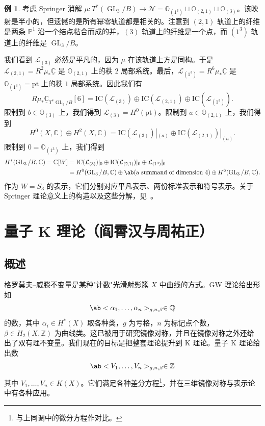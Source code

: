\documentclass{amsart}
\theoremstyle{definition}
\newtheorem{exm}[thm]{例}
\theoremstyle{remark}
\theoremstyle{plain}
\theoremstyle{definition}
\theoremstyle{remark}
\newcommand{\C}{\mathbb{C}}
\newcommand{\Z}{\mathbb{Z}}
\newcommand{\Q}{\mathbb{Q}}
\renewcommand{\P}{\mathbb{P}}
\newcommand{\mc}[1]{\mathcal{#1}}
\newcommand{\mr}[1]{\mathrm{#1}}
\newcommand{\on}[1]{\operatorname{#1}}
\newcommand{\ul}[1]{\underline{#1}}
\newcommand{\1}{\mathbf{1}}
\newcommand{\2}{\mathbf{2}}
\newcommand{\3}{\mathbf{3}}
\begin{document}
\begin{exm}
    考虑 Springer 消解 \(\mu \colon T^*(\on{GL}_3/B) \to \mc{N} = \mathbb{O}_{(1^3)} \sqcup \mathbb{O}_{(2,1)} \sqcup \mathbb{O}_{(3)}\)。该映射是半小的，但遗憾的是所有幂零轨道都是相关的。注意到 \((2,1)\) 轨道上的纤维是两条 \(\P^1\) 沿一个结点粘合而成的并，\((3)\) 轨道上的纤维是一个点，而 \((1^3)\) 轨道上的纤维是 \(\on{GL}_3/B\)。

    我们看到 \(\mc{L}_{(3)}\) 必然是平凡的，因为 \(\mu\) 在该轨道上方是同构。于是 \(\mc{L}_{(2,1)} = R^2 \mu_* \ul{\C}\) 是 \(\mathbb{O}_{(2,1)}\) 上的秩 \(2\) 局部系统。最后，\(\mc{L}_{(1^3)} = R^6 \mu_* \ul{\C}\) 是 \(\mathbb{O}_{(1^3)} = \mr{pt}\) 上的秩 \(1\) 局部系统。因此我们有
    \[ R \mu_* \ul{\C}_{T^*\on{GL}_3/B}[6] = \mr{IC}(\mc{L}_{(3)}) \oplus \mr{IC}(\mc{L}_{(2,1)}) \oplus \mr{IC}(\mc{L}_{(1^3)}). \]
    限制到 \(b \in \mathbb{O}_{(3)}\) 上，我们得到 \(\mc{L}_{(3)} = H^0(\mr{pt})\)。限制到 \(a \in \mathbb{O}_{(2,1)}\) 上，我们得到
    \[ H^0(X, \C) \oplus H^2(X, \C) = \mr{IC}(\mc{L}_{(3)})|_{(a)} \oplus \mr{IC}(\mc{L}_{(2,1)})|_{(a)}. \]
    限制到 \(0 = \mathbb{O}_{(1^3)}\) 上，我们得到
    \begin{align*}
        H^*(\on{GL}_3/B, \C) = \C[W] &= \mr{IC}(\mc{L}_{(3)})|_0 \oplus \mr{IC}(\mc{L}_{(2,1)})|_0 \oplus \mc{L}_{(1^3)}|_0 \\
        &= H^0(\on{GL}_3/B, \C) \oplus \ab(\text{a summand of dimension } 4) \oplus H^6(\on{GL}_3/B, \C).
    \end{align*}
    作为 \(W = S_3\) 的表示，它们分别对应平凡表示、两份标准表示和符号表示。关于 Springer 理论意义上的构造以及这些分解，见~\cite{BorhoMacPherson1983}。
\end{exm}


\section{量子 K 理论（阎霄汉与周祐正）}%
\label{sec:Quantum K-theory (Xiaohan Yan and You-Cheng Chou)}

\subsection{概述}%
\label{sub:Overview}

格罗莫夫–威滕不变量是某种"计数"光滑射影簇 \(X\) 中曲线的方式。GW 理论给出形如
\[ \ab<\alpha_1, \ldots, \alpha_n>_{g, n, \beta} \in \Q \]
的数，其中 \(\alpha_i \in H^*(X)\) 取各种类，\(g\) 为亏格，\(n\) 为标记点个数，\(\beta \in H_2(X, \Z)\) 为曲线类。这已被用于研究镜像对称，并且在镜像对称之外还给出了双有理不变量。我们现在的目标是把整套理论提升到 K 理论。量子 K 理论给出数
\[ \ab<V_1, \ldots, V_n>_{g, n, \beta} \in \Z \]
其中 \(V_1, \ldots, V_n \in K(X)\)。它们满足各种差分方程\footnote{与上同调中的微分方程作对比。}，并在三维镜像对称与表示论中有各种应用。
\end{document}
